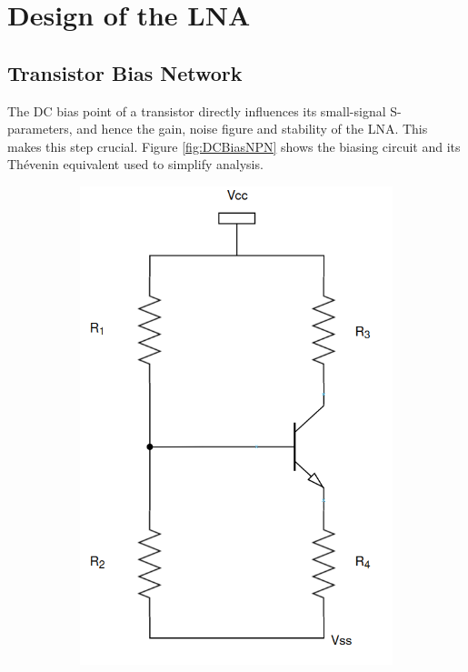 \section{Design of the LNA}

\subsection{Transistor Bias Network}

The DC bias point of a transistor directly influences its small-signal S-parameters, and hence the gain, noise figure and stability of the LNA. This makes this step crucial.
Figure \ref{fig:DCBiasNPN} shows the biasing circuit and its Thévenin equivalent used to simplify analysis.

\begin{figure}[H]
    \centering
    \begin{subfigure}{0.4\textwidth}
        \includegraphics*[scale = 0.3]{Images/DCBiasNPN.png}

\end{subfigure}
\end{figure}
